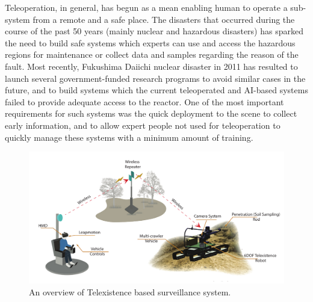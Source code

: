 Teleoperation, in general, has begun as a mean enabling human to operate a sub-system from a remote and a safe place. The disasters that occurred during the course of the past 50 years (mainly nuclear and hazardous disasters) has sparked the need to build safe systems which experts can use and access the hazardous regions for maintenance or collect data and samples regarding the reason of the fault. Most recently, Fukushima Daiichi nuclear disaster in 2011 has resulted to launch several government-funded research programs to avoid similar cases in the future, and to build systems which the current teleoperated and AI-based systems failed to provide adequate access to the reactor. One of the most important requirements for such systems was the quick deployment to the scene to collect early information, and to allow expert people not used for teleoperation to quickly manage these systems with a minimum amount of training.



\begin{figure}[t!]
  \centering
	  \includegraphics[width=1\linewidth]{figures/eval/NEDO/Overview.pdf}
  \captionsetup{justification=centering}
  \caption{An overview of Telexistence based surveillance system.}
  \label{fig:usability-nedo-overview}
\end{figure}


